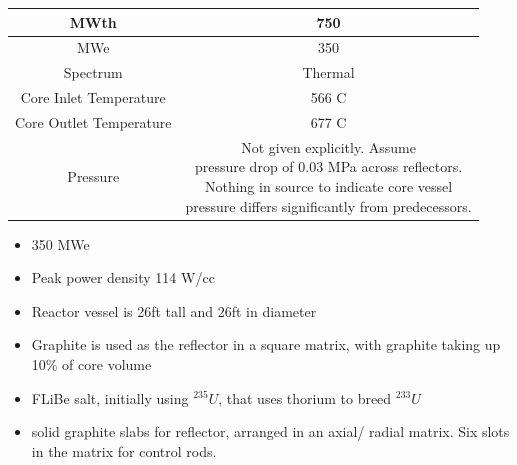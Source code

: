 \documentclass[letterpaper]{article}
\begin{document}
\begin{center}
\begin{tabular}{|c|c|}
\hline
MWth & 750 \\
\hline
MWe & 350 \\
\hline
Spectrum & Thermal \\
\hline
Core Inlet Temperature & 566 C\\
\hline
Core Outlet Temperature & 677 C\\
\hline
Pressure & \makecell{Not given explicitly.  Assume\\pressure drop of 0.03 MPa across reflectors.\\Nothing in source to indicate core vessel\\pressure differs significantly from predecessors.} \\
\hline
\end{tabular}
\end{center}

\begin{itemize}
\item 350 MWe
\item Peak power density 114 W/cc
\item Reactor vessel is 26ft tall and 26ft in diameter
\item Graphite is used as the reflector in a square matrix, with graphite taking up 10\% of core volume
\item FLiBe salt, initially using ${}^{235}U$, that uses thorium to breed ${}^{233}U$
\item solid graphite slabs for reflector, arranged in an axial/ radial matrix.  Six slots in the matrix for control rods.
\end{itemize}
\end{document}
